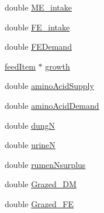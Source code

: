 \begin{DoxyCompactItemize}
double \hyperlink{classcattle_a0579aa4830ea3b218896c017e61fc904}{ME\_\-intake}
\item 
double \hyperlink{classcattle_aabaeb5143d3c02eebe3ef676319fb5a0}{FE\_\-intake}
\item 
double \hyperlink{classcattle_a63d4959fc2ec85e12dce81130e1829dc}{FEDemand}
\item 
\hyperlink{classfeed_item}{feedItem} $\ast$ \hyperlink{classcattle_adda7b2882e426ad63090673d102d27bc}{growth}
\item 
double \hyperlink{classcattle_ad77f647e607efacadcec9aa8ef82de2c}{aminoAcidSupply}
\item 
double \hyperlink{classcattle_abd8875c6b64433fd2dbd14593c8bd961}{aminoAcidDemand}
\item 
double \hyperlink{classcattle_a3abd49d3221dd7a38255a4bffd7770b3}{dungN}
\item 
double \hyperlink{classcattle_a6743facaa4de4b92350ef52cc2e6b8ed}{urineN}
\item 
double \hyperlink{classcattle_ad2e1f9f817dc243c4ca19136e0871b77}{rumenNsurplus}
\item 
double \hyperlink{classcattle_a8d36e025177454054e92c45378279615}{Grazed\_\-DM}
\item 
double \hyperlink{classcattle_a6c58edc9e56731094dd5a097f058c2ea}{Grazed\_\-FE}
\end{DoxyCompactItemize}



